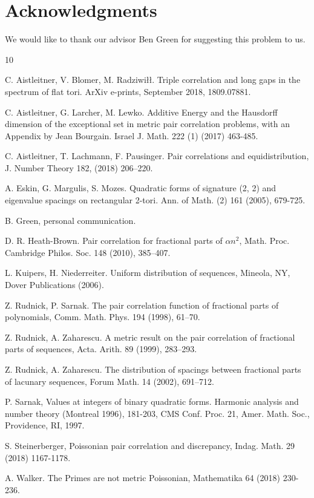 \documentclass[12pt]{amsart}
\theoremstyle{definition}
\newcommand{\vs}{\vspace{3mm}}
\begin{document}
\vs

\section{Acknowledgments}\label{acknowledgments}

We would like to thank our advisor Ben Green for suggesting this problem to us. 





\vs

\begin{thebibliography}{10}

 C. Aistleitner, V. Blomer, M. Radziwi\l\l. Triple correlation and long gaps in the spectrum of flat tori. ArXiv e-prints, September 2018, 1809.07881.

 C. Aistleitner, G. Larcher, M. Lewko. Additive Energy and the Hausdorff dimension of the exceptional set in metric pair correlation problems, with an Appendix by Jean Bourgain. Israel J. Math. 222 (1) (2017) 463-485. 

 C. Aistleitner, T. Lachmann, F. Pausinger. Pair correlations and equidistribution, J. Number Theory 182, (2018) 206–220.

 A. Eskin, G. Margulis, S. Mozes. Quadratic forms of signature (2, 2) and eigenvalue spacings on rectangular 2-tori. Ann. of Math. (2) 161 (2005), 679-725.

 B. Green, personal communication.

 D. R. Heath-Brown. Pair correlation for fractional parts of $\alpha n^2$, Math. Proc. Cambridge Philos. Soc. 148 (2010), 385–407.

 L. Kuipers, H. Niederreiter. Uniform distribution of sequences, Mineola, NY, Dover Publications (2006).‌

 Z. Rudnick, P. Sarnak. The pair correlation function of fractional parts of polynomials, Comm. Math. Phys. 194 (1998), 61–70.

 Z. Rudnick, A. Zaharescu. A metric result on the pair correlation of fractional parts of sequences, Acta. Arith. 89 (1999), 283–293.

 Z. Rudnick, A. Zaharescu. The distribution of spacings between fractional parts of lacunary sequences, Forum Math. 14 (2002), 691–712.

 P. Sarnak, Values at integers of binary quadratic forms. Harmonic analysis and number
theory (Montreal 1996), 181-203, CMS Conf. Proc. 21, Amer. Math. Soc., Providence, RI, 1997.

 S. Steinerberger, Poissonian pair correlation and discrepancy, Indag. Math. 29 (2018) 1167-1178.

 A. Walker. The Primes are not metric Poissonian, Mathematika 64 (2018) 230-236.

\end{thebibliography}
\end{document}
